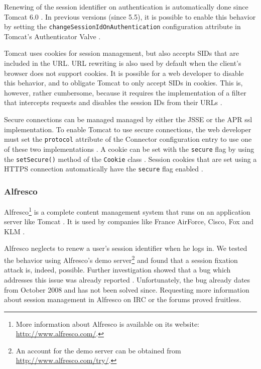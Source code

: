 Renewing of the session identifier on authentication is automatically done since Tomcat 6.0 \cite{TomcatAuthentication6}. In previous versions (since 5.5), it is possible to enable this behavior by setting the \texttt{changeSessionIdOnAuthentication} configuration attribute in Tomcat's Authenticator Valve \cite{TomcatAuthentication5}.

Tomcat uses cookies for session management, but also accepts SIDs that are included in the URL. URL rewriting is also used by default when the client's browser does not support cookies. It is possible for a web developer to disable this behavior, and to obligate Tomcat to only accept SIDs in cookies. This is, however, rather cumbersome, because it requires the implementation of a filter that intercepts requests and disables the session IDs from their URLs \cite{Condit2006}.

Secure connections can be managed managed by either the JSSE or the APR \gls{ssl} implementation. To enable Tomcat to use secure connections, the web developer must set the \texttt{protocol} attribute of the Connector configuration entry to use one of these two implementations \cite{TomcatSSL}. A cookie can be set with the \texttt{secure} flag by using the \texttt{setSecure()} method of the \texttt{Cookie} class \cite{TomcatCookie}. Session cookies that are set using a HTTPS connection automatically have the \texttt{secure} flag enabled \cite{Funk2004}.

\subsubsection{Alfresco}

Alfresco\footnote{More information about Alfresco is available on its website: \url{http://www.alfresco.com/}.} is a complete content management system that runs on an application server like Tomcat \cite{TomcatPoweredBy}. It is used by companies like France AirForce, Cisco, Fox and KLM \cite{AlfrescoPoweredBy}.

Alfresco neglects to renew a user's session identifier when he logs in. We tested the behavior using Alfresco's demo server\footnote{An account for the demo server can be obtained from \url{http://www.alfresco.com/try/}.} and found that a session fixation attack is, indeed, possible. Further investigation showed that a bug which addresses this issue was already reported \cite{AlfrescoSessionFixation}. Unfortunately, the bug already dates from October 2008 and has not been solved since. Requesting more information about session management in Alfresco on IRC or the forums proved fruitless.

